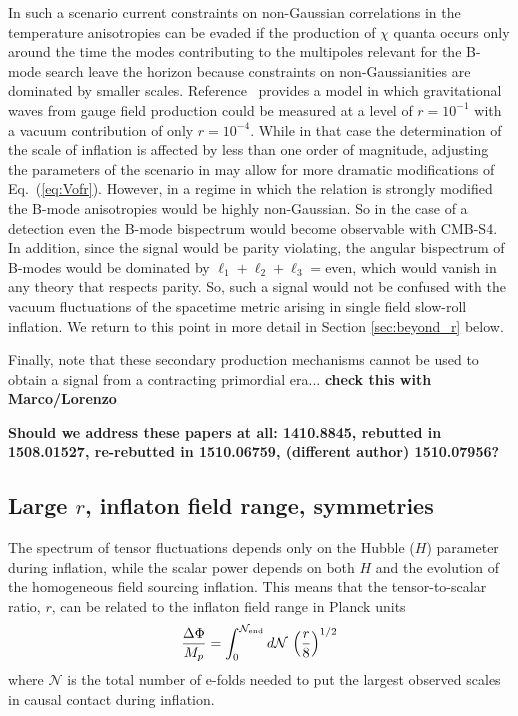 In such a scenario current constraints on non-Gaussian correlations in the temperature anisotropies can be evaded if the production of $\chi$ quanta occurs only around the time the modes contributing to the multipoles relevant for the B-mode search leave the horizon \cite{Namba:2015gja} because constraints on non-Gaussianities are dominated by smaller scales. Reference~\cite{Namba:2015gja} provides a model in which gravitational waves from gauge field production could be measured at a level of $r=10^{-1}$ with a vacuum contribution of only $r=10^{-4}$. While in that case the determination of the scale of inflation is affected by less than one order of magnitude, adjusting the parameters of the scenario in may allow for more dramatic modifications of Eq.~(\ref{eq:Vofr}). However, in a regime in which the relation is strongly modified the B-mode anisotropies would be highly non-Gaussian. So in the case of a detection even the B-mode bispectrum would become observable with CMB-S4. In addition, since the signal would be parity violating, the angular bispectrum of B-modes would be dominated by $\ell_1+\ell_2+\ell_3=$even, which would vanish in any theory that respects parity. So, such a signal would not be confused with the vacuum fluctuations of the spacetime metric arising in single field slow-roll inflation. We return to this point in more detail in Section \ref{sec:beyond_r} below.

Finally, note that these secondary production mechanisms cannot be used to obtain a signal from a contracting primordial era... {\bf check this with Marco/Lorenzo}


{\bf Should we address these papers at all: 1410.8845, rebutted in 1508.01527, re-rebutted in 1510.06759, (different author) 1510.07956?}


\subsection{Large $r$, inflaton field range, symmetries}
The spectrum of tensor fluctuations depends only on the Hubble ($H$) parameter during inflation, while the scalar power depends on both $H$ and the evolution of the homogeneous field sourcing inflation. This means that the tensor-to-scalar ratio, $r$, can be related to the inflaton field range in Planck units \cite{Lyth:1996im}
\begin{equation}
\label{eq:Lyth}
\frac{\Delta\Phi}{M_p}=\int_0^{\mathcal{N}_{\rm end}}d\mathcal{N}\,\left(\frac{r}{8}\right)^{1/2}
\end{equation}
where $\mathcal{N}$ is the total number of e-folds needed to put the largest observed scales in causal contact during inflation.

